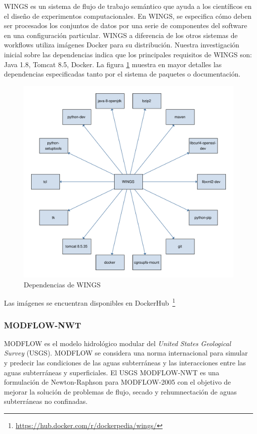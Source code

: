 WINGS es un sistema de flujo de trabajo semántico que ayuda a los científicos en el diseño de experimentos computacionales. 
En WINGS, se especifica cómo deben ser procesados los conjuntos de datos por una serie de componentes del software en una configuración particular.
WINGS a diferencia de los otros sistemas de workflows utiliza imágenes Docker para su distribución.
Nuestra investigación inicial sobre las dependencias indica que los principales requisitos de WINGS son: Java 1.8, Tomcat 8.5, Docker. La figura \ref{fig:wings-deps} muestra en mayor detalles las dependencias especificadas tanto por el sistema de paquetes o documentación.

\begin{figure}[t]
\centering
\includegraphics[width=.8\textwidth]{Figures/wings-deps}
\caption{Dependencias de WINGS}\label{fig:wings-deps}
\end{figure}

Las imágenes se encuentran disponibles en DockerHub~\footnote{\url{https://hub.docker.com/r/dockerpedia/wings/}}


\subsubsection{MODFLOW-NWT}

MODFLOW es el modelo hidrológico modular del \textit{United States Geological Survey} (USGS). MODFLOW se considera una norma internacional para simular y predecir las condiciones de las aguas subterráneas y las interacciones entre las aguas subterráneas y superficiales.
El USGS MODFLOW-NWT es una formulación de Newton-Raphson para MODFLOW-2005 con el objetivo de mejorar la solución de problemas de flujo, secado y rehumnectación de aguas subterráneas no confinadas.

